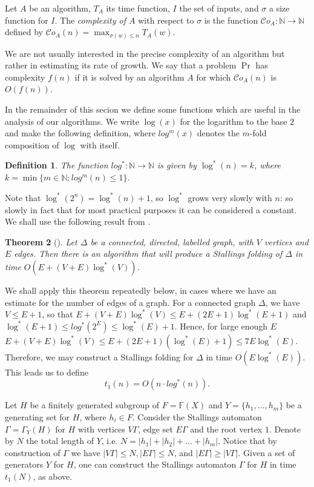 \documentclass[a4paper,12pt]{article}
\newcommand{\G}{\Gamma }
\newcommand{\D}{\Delta }
\newtheorem{theorem}{Theorem}[section]
\newtheorem{definition}[theorem]{Definition}
\numberwithin{equation}{section}
\numberwithin{figure}{section}
\newcommand{\NN}{\ensuremath{\mathbb{N}}}
\newcommand{\FF}{\ensuremath{\mathbb{F}}}
\newcommand{\cC}{\mathcal{C}}
\newcommand{\maps}{\rightarrow}
\begin{document}
Let $A$ be an algorithm, $T_{A}$ its time function, $I$ the set of
inputs, and $\sigma$ a size function for $I$. The \emph{ complexity of $A$} with respect to $\sigma$ is the function
$\cC o_{A}:\NN \to \NN$ defined by $\cC o_{A}(n)=\max_{\sigma(w)\le n}
T_{A}(w)$.

We are not usually interested in the precise complexity of an algorithm 
but rather in estimating its rate of growth. We say that a problem
$\Pr$ has  complexity $f(n)$ if it is solved by an
algorithm $A$ for which $\cC o_{A}(n)$ is $O(f(n))$.

In the remainder of this secion we define some functions which are useful
in the analysis of our algorithms. We write $\log(x)$ for the logarithm to the base $2$ and make the
following definition, where $log^m(x)$ denotes the $m$-fold composition
of $\log$ with itself.
\begin{definition}\label{def:log}
The function $log^*:\NN\maps \NN$ is given by $\log^*(n)=k$, where
$k=\min\{m\in \NN: log^m(n)\le 1\}$.
\end{definition}
Note that $\log^*(2^n)=\log^*(n)+1$, so $\log^*$ grows very slowly with $n$:
so slowly in fact that for most practical purposes it can be
considered a constant.
We shall use the following result from \cite{touikan06}.
\begin{theorem}[{\cite[Theorem 1.6]{touikan06}}]%
Let $\D$ be a connected, directed, labelled graph, with $V$ vertices and
$E$ edges. Then there is an algorithm that will produce a Stallings folding of
$\D$ in time $O(E+(V+E)\log^*(V))$.
\end{theorem}

We shall apply this theorem repeatedly below, in cases where we
have an estimate for the number of edges of a graph. For a
connected graph $\D$, we have $V\le E+1$, so that
$E+(V+E)\log^*(V)\le E+(2E+1)\log^*(E+1)$ and $\log^*(E+1)\le
log^*(2^E)\le \log^*(E)+1$. Hence, for large enough $E$
$E+(V+E)\log^*(V)\le E+(2E+1)(\log^*(E)+1)\le 7E\log^*(E)$.
Therefore, we may construct a Stallings folding for $\D$ in time
$O(E\log^*(E))$. This leads us to define
\begin{equation}\label{t1} t_1(n) = O (n \cdot log^{\ast}(n)).
\end{equation}

Let $H$ be a finitely generated subgroup of $F=\FF(X)$ and
$Y=\{h_1,\ldots ,h_m\}$ be a generating set for $H$, where $h_i\in
F$. Consider the Stallings automaton $\G = \G_Y(H)$ for $H$ with
vertices $V\G$, edge set $E\G$ and the root vertex $1$. Denote by
$N$ the total length of $Y$, i.e. $N = |h_1| + |h_2| + \ldots +
|h_m|$. Notice that by construction of $\G$ we have $|V\G| \le N,
|E\G| \le N$, and $|E \G| \ge |V \G|$.
Given a set of generators $Y$ for $H$, one can construct the
Stallings automaton $\G$ for $H$ in time $t_1(N)$, as above.
\end{document}
